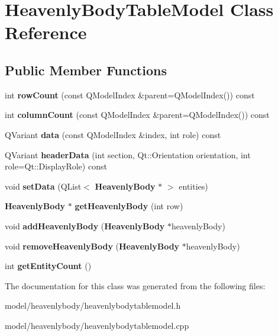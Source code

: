 \section{\-Heavenly\-Body\-Table\-Model \-Class \-Reference}
\label{da/dd6/classHeavenlyBodyTableModel}
\subsection*{\-Public \-Member \-Functions}
\begin{DoxyCompactItemize}
\item 
int {\bfseries row\-Count} (const \-Q\-Model\-Index \&parent=\-Q\-Model\-Index()) const \label{da/dd6/classHeavenlyBodyTableModel_aba97512e0a8a43331dd6feeaa27fb66a}

\item 
int {\bfseries column\-Count} (const \-Q\-Model\-Index \&parent=\-Q\-Model\-Index()) const \label{da/dd6/classHeavenlyBodyTableModel_aeee6cd311fa44f8f276d473e874608c4}

\item 
\-Q\-Variant {\bfseries data} (const \-Q\-Model\-Index \&index, int role) const \label{da/dd6/classHeavenlyBodyTableModel_ab450e3826f355205a1336681a7e006cd}

\item 
\-Q\-Variant {\bfseries header\-Data} (int section, \-Qt\-::\-Orientation orientation, int role=\-Qt\-::\-Display\-Role) const \label{da/dd6/classHeavenlyBodyTableModel_a0709ed21d963741035372724d0170cd6}

\item 
void {\bfseries set\-Data} (\-Q\-List$<$ {\bf \-Heavenly\-Body} $\ast$ $>$ entities)\label{da/dd6/classHeavenlyBodyTableModel_a778e03d39ffc8de5535338cc0c376490}

\item 
{\bf \-Heavenly\-Body} $\ast$ {\bfseries get\-Heavenly\-Body} (int row)\label{da/dd6/classHeavenlyBodyTableModel_aa1f5ef18f01caefb1fd8ba203eb120b6}

\item 
void {\bfseries add\-Heavenly\-Body} ({\bf \-Heavenly\-Body} $\ast$heavenly\-Body)\label{da/dd6/classHeavenlyBodyTableModel_ac330b96c60f4ae48779d22b7ab20a0a2}

\item 
void {\bfseries remove\-Heavenly\-Body} ({\bf \-Heavenly\-Body} $\ast$heavenly\-Body)\label{da/dd6/classHeavenlyBodyTableModel_a33c83125e548ef7517a9badd4088ff55}

\item 
int {\bfseries get\-Entity\-Count} ()\label{da/dd6/classHeavenlyBodyTableModel_ae5686498c41df95b2764c2fdaff3e2a8}

\end{DoxyCompactItemize}


\-The documentation for this class was generated from the following files\-:\begin{DoxyCompactItemize}
\item 
model/heavenlybody/heavenlybodytablemodel.\-h\item 
model/heavenlybody/heavenlybodytablemodel.\-cpp\end{DoxyCompactItemize}
